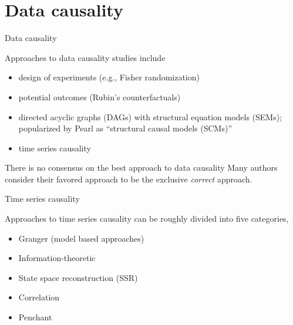 \documentclass{beamer}
\begin{document}
\section{Data causality}
\begin{frame}{Data causality}
\vspace{0.25in}

\pause
Approaches to data causality studies include
\begin{itemize}
\item design of experiments (e.g., Fisher randomization)
\pause
\item potential outcomes (Rubin's counterfactuals)
\pause
\item directed acyclic graphs (DAGs) with structural equation models (SEMs); popularized by Pearl as ``structural causal models (SCMs)''
\pause
\item \alert<7>{time series causality}
\end{itemize}
\pause
\begin{block}{There is no consensus on the best approach to data causality}
Many authors consider their favored approach to be the exclusive {\em correct} approach.  
\end{block}
\end{frame}

\begin{frame}{Time series causality}
\vspace{0.25in}
\pause

Approaches to time series causality can be roughly divided into five categories,
\begin{itemize}
\item Granger (model based approaches)
\item Information-theoretic 
\item State space reconstruction (SSR)
\item Correlation 
\item Penchant
\end{itemize}

\end{frame}
\end{document}
